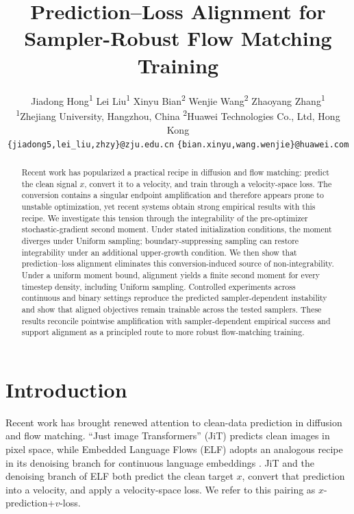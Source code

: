 \documentclass{article}
\title{Prediction--Loss Alignment for\\
Sampler-Robust Flow Matching Training}
\author{%
  Jiadong Hong\textsuperscript{1}\quad
  Lei Liu\textsuperscript{1}\quad
  Xinyu Bian\textsuperscript{2}\quad
  Wenjie Wang\textsuperscript{2}\quad
  Zhaoyang Zhang\textsuperscript{1}\\[3pt]
  {\normalfont\small\textsuperscript{1}Zhejiang University, Hangzhou, China\quad
  \textsuperscript{2}Huawei Technologies Co., Ltd, Hong Kong}\\
  {\normalfont\footnotesize\texttt{\{jiadong5,lei\_liu,zhzy\}@zju.edu.cn}\quad
  \texttt{\{bian.xinyu,wang.wenjie\}@huawei.com}}
}
\theoremstyle{plain}
\theoremstyle{definition}
\theoremstyle{remark}
\begin{document}
\maketitle

\begin{abstract}
Recent work has popularized a practical recipe in diffusion and flow matching: predict the clean signal $x$, convert it to a velocity, and train through a velocity-space loss. The conversion contains a singular endpoint amplification and therefore appears prone to unstable optimization, yet recent systems obtain strong empirical results with this recipe. We investigate this tension through the integrability of the pre-optimizer stochastic-gradient second moment. Under stated initialization conditions, the moment diverges under Uniform sampling; boundary-suppressing sampling can restore integrability under an additional upper-growth condition. We then show that prediction--loss alignment eliminates this conversion-induced source of non-integrability. Under a uniform moment bound, alignment yields a finite second moment for every timestep density, including Uniform sampling. Controlled experiments across continuous and binary settings reproduce the predicted sampler-dependent instability and show that aligned objectives remain trainable across the tested samplers. These results reconcile pointwise amplification with sampler-dependent empirical success and support alignment as a principled route to more robust flow-matching training.
\end{abstract}

\section{Introduction}
\label{sec:introduction}

Recent work has brought renewed attention to clean-data prediction in diffusion and flow matching. ``Just image Transformers'' (JiT) predicts clean images in pixel space, while Embedded Language Flows (ELF) adopts an analogous recipe in its denoising branch for continuous language embeddings \citep{li2025back,hu2026elf}. JiT and the denoising branch of ELF both predict the clean target $x$, convert that prediction into a velocity, and apply a velocity-space loss. We refer to this pairing as $x$-prediction+$v$-loss.
\end{document}
